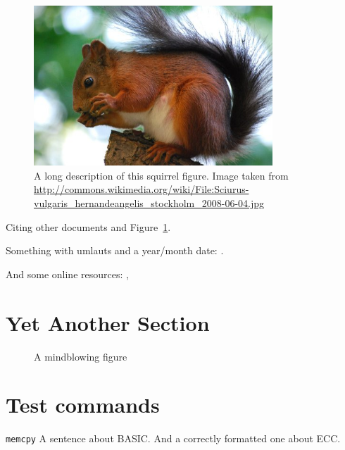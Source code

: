 \begin{figure}[tbp]
  \centering
  \includegraphics[width=0.8\textwidth]{images/squirrel}
  \caption[Short description]{A long description of this squirrel figure.
  Image taken from
  \url{http://commons.wikimedia.org/wiki/File:Sciurus-vulgaris_hernandeangelis_stockholm_2008-06-04.jpg}}
  \label{fig:squirrel}
\end{figure}

Citing \cite{bellard2005qfa} other documents \cite{bellard2005qfa, boileau06}
and Figure~\ref{fig:squirrel}.

Something with umlauts and a year/month date:
\cite{becher04:_feurig_hacken_mit_firew}.

And some online resources: \cite{green04}, \cite{patent:4819234}

\section{Yet Another Section}


\begin{figure}[tbp]
 \caption{A mindblowing figure}
 \label{fig:todo}
\end{figure}

\section{Test commands}

\texttt{memcpy}
A sentence about BASIC. And a correctly formatted one about ECC\@.

\cleardoublepage

